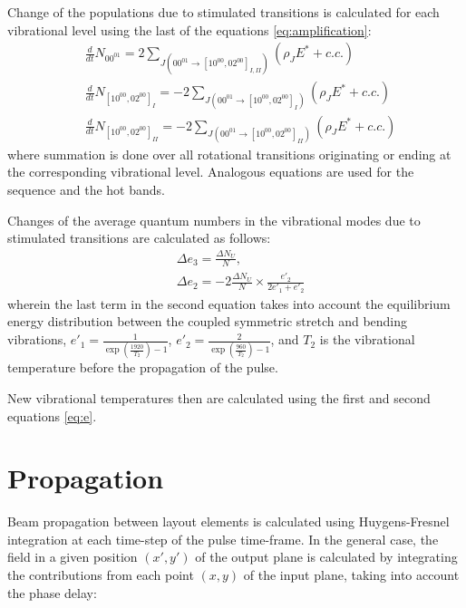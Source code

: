 \documentclass{report}
\begin{document}
Change of the populations due to stimulated transitions is calculated for each vibrational level using the last of the equations \ref{eq:amplification}:
\begin{equation}\label{eq:dNdt}
\begin{aligned}
&\frac{d}{dt}N_{00^01} = 2\sum\limits_{J(00^01\rightarrow[10^00,02^00]_{I,II})} (\rho _J E^* + c.c.)\\
&\frac{d}{dt}N_{[10^00,02^00]_I} =  -2\sum\limits_{J(00^01\rightarrow[10^00,02^00]_I)} (\rho _J E^* + c.c.)\\
&\frac{d}{dt}N_{[10^00,02^00]_{II}} =  -2\sum\limits_{J(00^01\rightarrow[10^00,02^00]_{II})} (\rho _J E^* + c.c.)
\end{aligned}
\end{equation}
where summation is done over all rotational transitions originating or ending at the corresponding vibrational level. Analogous equations are used for the sequence and the hot bands.

Changes of the average quantum numbers in the vibrational modes due to stimulated transitions are calculated as follows:
\begin{equation}\label{eq:Deltae}
\begin{aligned}
&\Delta e_3 = \frac{\Delta N_U}{N},\\
&\Delta e_2 = -2\frac{\Delta N_U}{N} \times \frac{e'_2}{2e'_1+e'_2}
\end{aligned}
\end{equation}
wherein the last term in the second equation takes into account the equilibrium energy distribution between the coupled symmetric stretch and bending vibrations, $e'_1 = \frac{1}{\exp\left(\frac{1920}{T_2}\right)-1}$, $e'_2 = \frac{2}{\exp\left(\frac{960}{T_2}\right)-1}$, and $T_2$ is the vibrational temperature before the propagation of the pulse.

New vibrational temperatures then are calculated using the first and second equations \ref{eq:e}.



\section{Propagation}
Beam propagation between layout elements is calculated using Huygens-Fresnel integration at each time-step of the pulse time-frame. In the general case, the field in a given position $(x',y')$ of the output plane is calculated by integrating the contributions from each point $(x,y)$ of the input plane, taking into account the phase delay:
\end{document}
